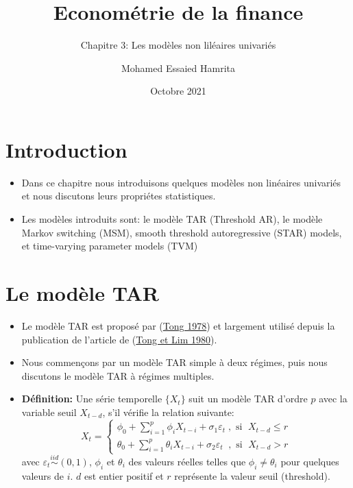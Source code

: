 \documentclass[
  french,
]{article}
\title{Econométrie de la finance}
\subtitle{Chapitre 3: Les modèles non liléaires univariés}
\author{Mohamed Essaied Hamrita}
\date{Octobre 2021}
\begin{document}
\maketitle

{
\hypersetup{linkcolor=}
\setcounter{tocdepth}{2}
\tableofcontents
}
\hypertarget{introduction}{%
\section{Introduction}\label{introduction}}

\begin{itemize}
\item
  Dans ce chapitre nous introduisons quelques modèles non linéaires
  univariés et nous discutons leurs propriétes statistiques.
\item
  Les modèles introduits sont: le modèle TAR (Threshold AR), le modèle
  Markov switching (MSM), smooth threshold autoregressive (STAR) models,
  et time-varying parameter models (TVM)
\end{itemize}

\hypertarget{le-moduxe8le-tar}{%
\section{Le modèle TAR}\label{le-moduxe8le-tar}}

\begin{itemize}
\item
  Le modèle TAR est proposé par (\protect\hyperlink{ref-tong78}{Tong
  1978}) et largement utilisé depuis la publication de l'article de
  (\protect\hyperlink{ref-tong80}{Tong et Lim 1980}).
\item
  Nous commençons par un modèle TAR simple à deux régimes, puis nous
  discutons le modèle TAR à régimes multiples.
\item
  \textbf{Définition:} Une série temporelle \(\{X_t\}\) suit un modèle
  TAR d'ordre \(p\) avec la variable seuil \(X_{t-d}\), s'il vérifie la
  relation suivante: \[
  X_t=\begin{cases}
  \phi_0+\displaystyle\sum_{i=1}^p\phi_iX_{t-i}+\sigma_1\varepsilon_t \;,\text{ si }\; X_{t-d} \leq r\\
  \theta_0+\displaystyle\sum_{i=1}^p\theta_iX_{t-i}+\sigma_2\varepsilon_t \;\;,\text{ si }\; X_{t-d} > r
  \end{cases}
  \] avec \(\varepsilon_t \stackrel{iid}{\sim}(0,1)\), \(\phi_i\) et
  \(\theta_i\) des valeurs réelles telles que \(\phi_i \neq \theta_i\)
  pour quelques valeurs de \(i\). \(d\) est entier positif et \(r\)
  représente la valeur seuil (threshold).
\end{itemize}
\end{document}
